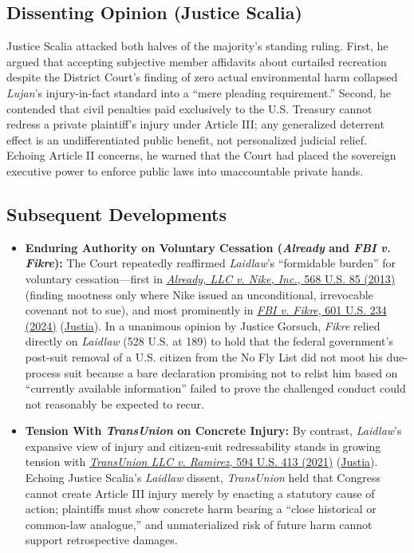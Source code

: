 \documentclass[12pt]{article}
\begin{document}
\subsection{Dissenting Opinion (Justice Scalia)}

Justice Scalia attacked both halves of the majority's standing ruling. First, he argued that accepting subjective member affidavits about curtailed recreation despite the District Court's finding of zero actual environmental harm collapsed \textit{Lujan}'s injury-in-fact standard into a ``mere pleading requirement.'' Second, he contended that civil penalties paid exclusively to the U.S. Treasury cannot redress a private plaintiff's injury under Article III; any generalized deterrent effect is an undifferentiated public benefit, not personalized judicial relief. Echoing Article II concerns, he warned that the Court had placed the sovereign executive power to enforce public laws into unaccountable private hands.

\subsection{Subsequent Developments}

\begin{itemize}

\item \textbf{Enduring Authority on Voluntary Cessation (\textit{Already} and \textit{FBI v. Fikre}):} The Court repeatedly reaffirmed \textit{Laidlaw}'s ``formidable burden'' for voluntary cessation---first in \href{https://www.law.cornell.edu/supremecourt/text/11-982}{\textit{Already, LLC v. Nike, Inc.}, 568 U.S. 85 (2013)} (finding mootness only where Nike issued an unconditional, irrevocable covenant not to sue), and most prominently in \href{https://www.supremecourt.gov/opinions/23pdf/601us1r11_7lh8.pdf}{\textit{FBI v. Fikre}, 601 U.S. 234 (2024)} (\href{https://supreme.justia.com/cases/federal/us/601/22-1178/}{Justia}). In a unanimous opinion by Justice Gorsuch, \textit{Fikre} relied directly on \textit{Laidlaw} (528 U.S. at 189) to hold that the federal government's post-suit removal of a U.S. citizen from the No Fly List did not moot his due-process suit because a bare declaration promising not to relist him based on ``currently available information'' failed to prove the challenged conduct could not reasonably be expected to recur.

\item \textbf{Tension With \textit{TransUnion} on Concrete Injury:} By contrast, \textit{Laidlaw}'s expansive view of injury and citizen-suit redressability stands in growing tension with \href{https://www.law.cornell.edu/supremecourt/text/20-297}{\textit{TransUnion LLC v. Ramirez}, 594 U.S. 413 (2021)} (\href{https://supreme.justia.com/cases/federal/us/594/20-297/}{Justia}). Echoing Justice Scalia's \textit{Laidlaw} dissent, \textit{TransUnion} held that Congress cannot create Article III injury merely by enacting a statutory cause of action; plaintiffs must show concrete harm bearing a ``close historical or common-law analogue,'' and unmaterialized risk of future harm cannot support retrospective damages.

\end{itemize}
\end{document}
